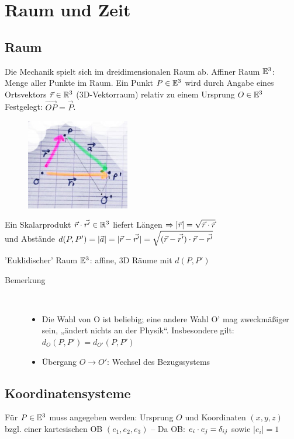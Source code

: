 \section{Raum und Zeit}

\subsection{Raum}
Die Mechanik spielt sich im dreidimensionalen Raum ab. Affiner Raum $\mathbb{E}^3$: Menge aller Punkte im Raum.
Ein Punkt $P\in\mathbb{E}^3$ wird durch Angabe eines Ortsvektors $\vec{r}\in\mathbb{R}^3$ (3D-Vektorraum) relativ zu einem Ursprung $O\in\mathbb{E}^3$ Festgelegt: $\vec{OP}=\vec{P}$.
\begin{figure}[h]
\begin{center}
\includegraphics[width=0.4\textwidth]{Skizzen/Anhang13.jpg}
\end{center}
\caption{}
\end{figure}

Ein Skalarprodukt $\vec{r}\cdot\vec{r'}\in\mathbb{R}^3$ liefert Längen $\Rightarrow|\vec{r}|=\sqrt{\vec{r}\cdot\vec{r}}$\\
und Abstände $d(P,P')=|\vec{a}|=|\vec{r}-\vec{r'}|=\sqrt{(\vec{r}-\vec{r'})\cdot\vec{r}-\vec{r'}}$

'Euklidischer' Raum $\mathbb{E}^3$: affine, 3D Räume mit $d(P,P')$
\begin{description}
\item[Bemerkung]~\par
\begin{itemize}
\item Die Wahl von O ist beliebig; eine andere Wahl O' mag
  zweckmäßiger sein, „ändert nichts an der Physik“.  Insbesondere
  gilt: $d_{O}(P,P')=d_{O'}(P,P')$
\item Übergang $O\rightarrow O'$: Wechsel des Bezugssystems
\end{itemize}
\end{description}

\subsection{Koordinatensysteme}
Für $P\in\mathbb{E}^3$ muss angegeben werden: Ursprung $O$ und Koordinaten $(x,y,z)$ bzgl. einer kartesischen OB $(e_1,e_2,e_3)$ -- Da OB: $e_i\cdot e_j=\delta_{ij}$ sowie $|e_i|=1$\\

